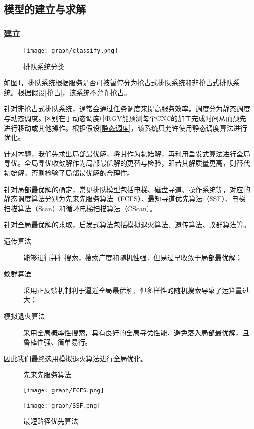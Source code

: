 	\subsection{模型的建立与求解}
		\subsubsection{建立}
			\begin{figure}[htbp]
				\centering
				\caption{排队系统分类}
				\label{排队系统分类}
				\texttt{[image: graph/classify.png]}
			\end{figure}
			如图\ref{排队系统分类}，排队系统根据服务是否可被暂停分为抢占式排队系统和非抢占式排队系统。根据假设\ref{抢占}，该系统不允许抢占。
			\par\indent 针对非抢占式排队系统，通常会通过任务调度来提高服务效率。调度分为静态调度与动态调度。区别在于动态调度中RGV能预测每个CNC的加工完成时间从而预先进行移动或其他操作。根据假设\ref{静态调度}，该系统只允许使用静态调度算法进行优化。
			\par\indent 针对本题，我们先求出局部最优解，将其作为初始解，再利用启发式算法进行全局寻优。全局寻优收敛解作为局部最优解的更替与检验，即若其解质量更高，则替代初始解，否则检验了局部最优解的合理性\cite{李睿智-400}。
			\par\indent 针对局部最优解的确定，常见排队模型包括电梯、磁盘寻道、操作系统等，对应的静态调度算法分别为先来先服务算法（FCFS）、最短寻道优先算法（SSF）、电梯扫描算法（Scan）和循环电梯扫描算法（CScan）。
			\par\indent 针对全局最优解的求取，启发式算法包括模拟退火算法、遗传算法、蚁群算法等。
			\begin{description}
				\item[遗传算法]能够进行并行搜索，搜索广度和随机性强，但易过早收敛于局部最优解；
				\item[蚁群算法]采用正反馈机制利于逼近全局最优解，但多样性的随机搜索导致了运算量过大；
				\item[模拟退火算法]\cite{钟志峰张田田-398}采用全局概率性搜索，具有良好的全局寻优性能、避免落入局部最优解，且鲁棒性强、简单易行。
			\end{description}
			\par\indent 因此我们最终选用模拟退火算法进行全局优化。
			\begin{figure}[htbp]
				\centering
				\begin{minipage}[htbp]{6cm}
					\centering
					\caption{先来先服务算法}
					\label{先来先服务算法}
					\texttt{[image: graph/FCFS.png]}
				\end{minipage}
				\begin{minipage}[htbp]{6cm}
					\centering
					\caption{ 最短路径优先算法}
					\label{ 最短路径优先算法}
					\texttt{[image: graph/SSF.png]}
				\end{minipage}
			\end{figure}
